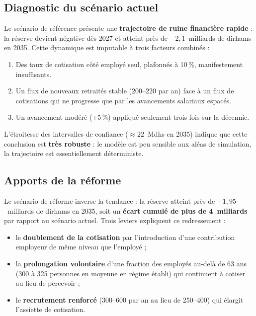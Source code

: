 \documentclass[12pt,a4paper,oneside]{report}
\begin{document}
\subsection{Diagnostic du scénario actuel}

Le scénario de référence présente une \textbf{trajectoire de
ruine financière rapide} : la réserve devient négative dès 2027 et
atteint près de $-2{,}1$~milliards de dirhams en 2035. Cette dynamique
est imputable à trois facteurs combinés :
\begin{enumerate}
  \item Des taux de cotisation côté employé seul, plafonnés à 10\,\%,
        manifestement insuffisants.
  \item Un flux de nouveaux retraités stable (200--220 par an) face à un
        flux de cotisations qui ne progresse que par les avancements
        salariaux espacés.
  \item Un avancement modéré (+5\,\%) appliqué seulement trois fois sur
        la décennie.
\end{enumerate}

L'étroitesse des intervalles de confiance ($\approx 22$~Mdhs en 2035)
indique que cette conclusion est \textbf{très robuste} : le modèle est
peu sensible aux aléas de simulation, la trajectoire est essentiellement
déterministe.

\subsection{Apports de la réforme}

Le scénario de réforme inverse la tendance : la réserve atteint près de
$+1{,}95$~milliards de dirhams en 2035, soit un \textbf{écart cumulé de
plus de 4~milliards} par rapport au scénario actuel. Trois leviers
expliquent ce redressement :
\begin{itemize}
  \item le \textbf{doublement de la cotisation} par l'introduction d'une
        contribution employeur de même niveau que l'employé ;
  \item la \textbf{prolongation volontaire} d'une fraction des employés
        au-delà de 63 ans (300 à 325 personnes en moyenne en
        régime établi) qui continuent à cotiser au lieu de percevoir ;
  \item le \textbf{recrutement renforcé} (300--600 par an au lieu de
        250--400) qui élargit l'assiette de cotisation.
\end{itemize}
\end{document}

